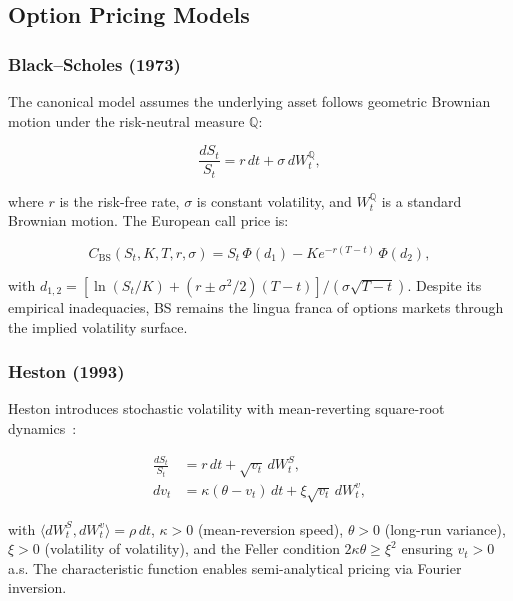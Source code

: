 \documentclass[11pt,a4paper]{article}
\theoremstyle{plain}
\theoremstyle{definition}
\theoremstyle{remark}
\newcommand{\inner}[1]{\langle#1\rangle}
\newcommand{\BS}{\text{BS}}
\newcommand{\riskneutral}{\mathbb{Q}}
\begin{document}
\subsection{Option Pricing Models}

\subsubsection{Black--Scholes (1973)}

The canonical model assumes the underlying asset follows geometric Brownian motion under the risk-neutral measure $\riskneutral$:

\begin{equation}\label{eq:bs_sde}
  \frac{dS_t}{S_t} = r\,dt + \sigma\,dW_t^{\riskneutral},
\end{equation}

where $r$ is the risk-free rate, $\sigma$ is constant volatility, and $W_t^{\riskneutral}$ is a standard Brownian motion. The European call price is:

\begin{equation}\label{eq:bs_price}
  C_{\BS}(S_t, K, T, r, \sigma) = S_t\,\Phi(d_1) - K e^{-r(T-t)}\,\Phi(d_2),
\end{equation}

with $d_{1,2} = [\ln(S_t/K) + (r \pm \sigma^2/2)(T-t)] / (\sigma\sqrt{T-t})$. Despite its empirical inadequacies, BS remains the lingua franca of options markets through the implied volatility surface.

\subsubsection{Heston (1993)}

Heston introduces stochastic volatility with mean-reverting square-root dynamics~\citep{heston1993closed}:

\begin{equation}\label{eq:heston_sde}
\begin{aligned}
  \frac{dS_t}{S_t} &= r\,dt + \sqrt{v_t}\,dW_t^S, \\
  dv_t &= \kappa(\theta - v_t)\,dt + \xi\sqrt{v_t}\,dW_t^v,
\end{aligned}
\end{equation}

with $\inner{dW_t^S, dW_t^v} = \rho\,dt$, $\kappa > 0$ (mean-reversion speed), $\theta > 0$ (long-run variance), $\xi > 0$ (volatility of volatility), and the Feller condition $2\kappa\theta \geq \xi^2$ ensuring $v_t > 0$ a.s. The characteristic function enables semi-analytical pricing via Fourier inversion.
\end{document}
